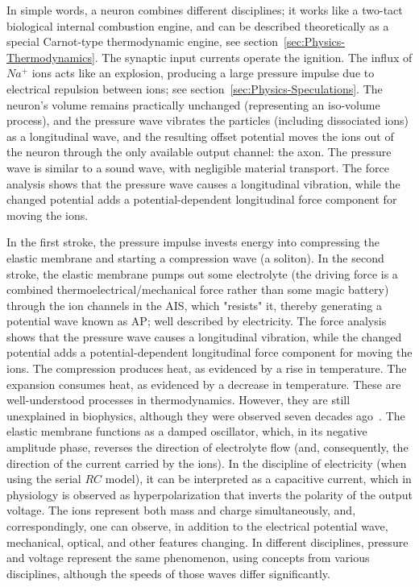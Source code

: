 In simple words, a neuron combines different disciplines; it works like a two-tact biological internal combustion engine, and can be described theoretically as a special Carnot-type thermodynamic engine, see section~\ref{sec:Physics-Thermodynamics}. The synaptic input currents operate the ignition. The influx of $Na^+$ ions acts like an explosion, producing a large pressure impulse due to electrical repulsion between ions; see section~\ref{sec:Physics-Speculations}. The neuron's volume remains practically unchanged (representing an iso-volume process), and the pressure wave vibrates the particles (including dissociated ions) as a longitudinal wave, and the resulting offset potential moves the ions out of the neuron through the only available output channel: the axon. The pressure wave is similar to a sound wave, with negligible material transport. 
The force analysis shows that the pressure wave
causes a longitudinal vibration, while the changed potential adds
a potential-dependent longitudinal force component for moving the ions.

In the first stroke, the pressure impulse invests energy into compressing the elastic membrane and starting a compression wave (a soliton). In the second stroke, the elastic membrane pumps out some electrolyte (the driving force is a combined thermoelectrical/mechanical force rather than some magic battery) through the ion channels in the \gls{AIS}, which "resists" it, thereby generating a potential wave known as \gls{AP}; well described by electricity. The force analysis shows that the pressure wave
causes a longitudinal vibration, while the changed potential adds
a potential-dependent longitudinal force component for moving the ions. The compression
produces heat, as evidenced by a rise in temperature. The expansion consumes heat, as evidenced by a decrease in temperature. These are well-understood processes in thermodynamics.
However, they are still unexplained in biophysics, although they were observed
seven decades ago~\cite{HeatProductionNeuron:1958}.
The elastic membrane functions as a damped oscillator, which, in its negative amplitude phase, reverses the direction of electrolyte flow (and, consequently, the direction of the current carried by the ions).
In the discipline of electricity (when using the serial $RC$ model), it can be interpreted as a capacitive current, which in physiology is observed as hyperpolarization that inverts the polarity of the output voltage.
The ions represent both mass and charge simultaneously, and, correspondingly, one can observe, in addition to the electrical potential wave, mechanical, optical, and other features changing.
In different disciplines, pressure and voltage represent the same phenomenon, using concepts from various disciplines, although the 
speeds of those waves differ significantly.

